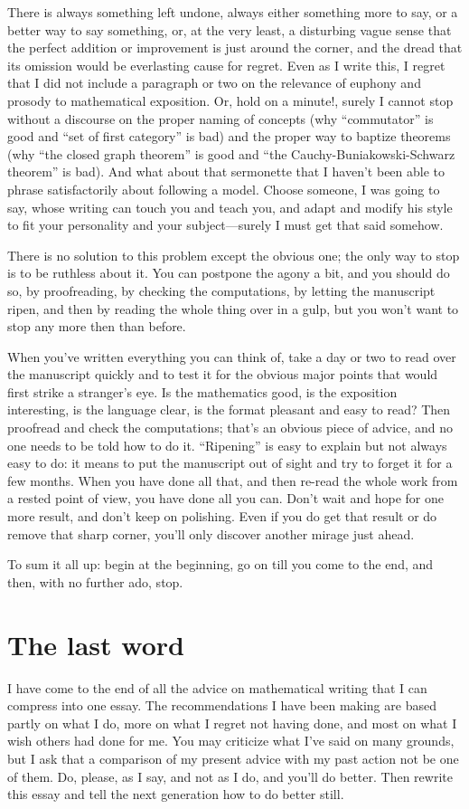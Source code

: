 \documentclass[12pt]{article}
\begin{document}
There is always something left undone, always either something more to say, or a better way to say something, or, at the very least, a disturbing vague sense that the perfect addition or improvement is just around the corner, and the dread that its omission would be everlasting cause for regret. Even as I write this, I regret that I did not include a paragraph or two on the relevance of euphony and prosody to mathematical exposition. Or, hold on a minute!, surely I cannot stop without a discourse on the proper naming of concepts (why ``commutator'' is good and ``set of first category'' is bad) and the proper way to baptize theorems (why ``the closed graph theorem'' is good and ``the Cauchy-Buniakowski-Schwarz theorem'' is bad). And what about that sermonette that I haven't been able to phrase satisfactorily about following a model. Choose someone, I was going to say, whose writing can touch you and teach you, and adapt and modify his style to fit your personality and your subject---surely I must get that said somehow. 

There is no solution to this problem except the obvious one; the only way to stop is to be ruthless about it. You can postpone the agony a bit, and you should do so, by proofreading, by checking the computations, by letting the manuscript ripen, and then by reading the whole thing over in a gulp, but you won't want to stop any more then than before. 

When you've written everything you can think of, take a day or two to read over the manuscript quickly and to test it for the obvious major points that would first strike a stranger's eye. Is the mathematics good, is the exposition interesting, is the language clear, is the format pleasant and easy to read? Then proofread and check the computations; that's an obvious piece of advice, and no one needs to be told how to do it. ``Ripening'' is easy to explain but not always easy to do: it means to put the manuscript out of sight and try to forget it for a few months. When you have done all that, and then re-read the whole work from a rested point of view, you have done all you can. Don't wait and hope for one more result, and don't keep on polishing. Even if you do get that result or do remove that sharp corner, you'll only discover another mirage just ahead. 

To sum it all up: begin at the beginning, go on till you come to the end, and then, with no further ado, stop. 

\section{The last word}

I have come to the end of all the advice on mathematical writing that I can compress into one essay. The recommendations I have been making are based partly on what I do, more on what I regret not having done, and most on what I wish others had done for me. You may criticize what I've said on many grounds, but I ask that a comparison of my present advice with my past action not be one of them. Do, please, as I say, and not as I do, and you'll do better. Then rewrite this essay and tell the next generation how to do better still.

\newpage
\printbibliography
\end{document}
